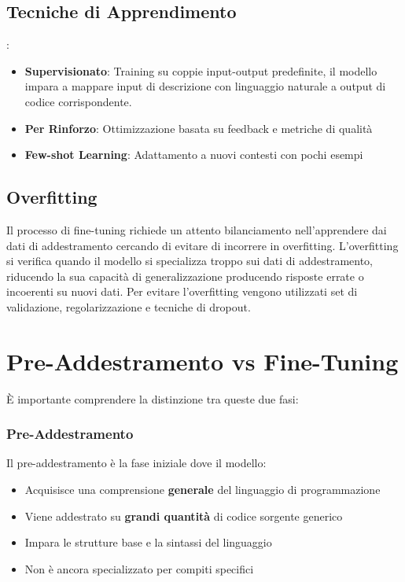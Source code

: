 \documentclass[12pt,a4paper,openright,twoside]{book}
\begin{document}
\subsection{Tecniche di Apprendimento}:
    \begin{itemize}
        \item \textbf{Supervisionato}: Training su coppie input-output predefinite, il modello impara a mappare input di descrizione con linguaggio naturale a output di codice corrispondente.
        \item \textbf{Per Rinforzo}: Ottimizzazione basata su feedback e metriche di qualità
        \item \textbf{Few-shot Learning}: Adattamento a nuovi contesti con pochi esempi
    \end{itemize}

\subsection{Overfitting}
Il processo di fine-tuning richiede un attento bilanciamento nell'apprendere dai dati di addestramento cercando di evitare di incorrere in overfitting.
L'overfitting si verifica quando il modello si specializza troppo sui dati di addestramento, riducendo la sua capacità di generalizzazione producendo risposte errate o incoerenti su nuovi dati.
Per evitare l'overfitting vengono utilizzati set di validazione, regolarizzazione e tecniche di dropout.
\section{Pre-Addestramento vs Fine-Tuning}
È importante comprendere la distinzione tra queste due fasi:
\subsubsection{Pre-Addestramento}
Il pre-addestramento è la fase iniziale dove il modello:
\begin{itemize}
    \item Acquisisce una comprensione \textbf{generale} del linguaggio di programmazione
    \item Viene addestrato su \textbf{grandi quantità} di codice sorgente generico
    \item Impara le strutture base e la sintassi del linguaggio
    \item Non è ancora specializzato per compiti specifici
\end{itemize}
\end{document}
